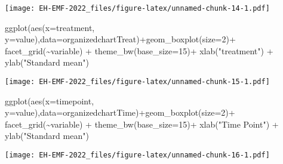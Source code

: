 \documentclass[
]{article}
\newenvironment{Shaded}{\begin{snugshade}}{\end{snugshade}}
\newcommand{\AttributeTok}[1]{\textcolor[rgb]{0.77,0.63,0.00}{#1}}
\newcommand{\DecValTok}[1]{\textcolor[rgb]{0.00,0.00,0.81}{#1}}
\newcommand{\FunctionTok}[1]{\textcolor[rgb]{0.00,0.00,0.00}{#1}}
\newcommand{\NormalTok}[1]{#1}
\newcommand{\SpecialCharTok}[1]{\textcolor[rgb]{0.00,0.00,0.00}{#1}}
\newcommand{\StringTok}[1]{\textcolor[rgb]{0.31,0.60,0.02}{#1}}
\begin{document}
\texttt{[image: EH-EMF-2022\_files/figure-latex/unnamed-chunk-14-1.pdf]}

\begin{Shaded}
\begin{Highlighting}[]
\FunctionTok{ggplot}\NormalTok{(}\FunctionTok{aes}\NormalTok{(}\AttributeTok{x=}\NormalTok{treatment, }\AttributeTok{y=}\NormalTok{value),}\AttributeTok{data=}\NormalTok{organizedchartTreat)}\SpecialCharTok{+}\FunctionTok{geom\_boxplot}\NormalTok{(}\AttributeTok{size=}\DecValTok{2}\NormalTok{)}\SpecialCharTok{+}
  \FunctionTok{facet\_grid}\NormalTok{(}\SpecialCharTok{\textasciitilde{}}\NormalTok{variable) }\SpecialCharTok{+}
  \FunctionTok{theme\_bw}\NormalTok{(}\AttributeTok{base\_size=}\DecValTok{15}\NormalTok{)}\SpecialCharTok{+}
  \FunctionTok{xlab}\NormalTok{(}\StringTok{"treatment"}\NormalTok{) }\SpecialCharTok{+}
  \FunctionTok{ylab}\NormalTok{(}\StringTok{"Standard mean"}\NormalTok{)}
\end{Highlighting}
\end{Shaded}

\texttt{[image: EH-EMF-2022\_files/figure-latex/unnamed-chunk-15-1.pdf]}

\begin{Shaded}
\begin{Highlighting}[]
\FunctionTok{ggplot}\NormalTok{(}\FunctionTok{aes}\NormalTok{(}\AttributeTok{x=}\NormalTok{timepoint, }\AttributeTok{y=}\NormalTok{value),}\AttributeTok{data=}\NormalTok{organizedchartTime)}\SpecialCharTok{+}\FunctionTok{geom\_boxplot}\NormalTok{(}\AttributeTok{size=}\DecValTok{2}\NormalTok{)}\SpecialCharTok{+}
  \FunctionTok{facet\_grid}\NormalTok{(}\SpecialCharTok{\textasciitilde{}}\NormalTok{variable) }\SpecialCharTok{+}
  \FunctionTok{theme\_bw}\NormalTok{(}\AttributeTok{base\_size=}\DecValTok{15}\NormalTok{)}\SpecialCharTok{+}
  \FunctionTok{xlab}\NormalTok{(}\StringTok{"Time Point"}\NormalTok{) }\SpecialCharTok{+}
  \FunctionTok{ylab}\NormalTok{(}\StringTok{"Standard mean"}\NormalTok{)}
\end{Highlighting}
\end{Shaded}

\texttt{[image: EH-EMF-2022\_files/figure-latex/unnamed-chunk-16-1.pdf]}
\end{document}
